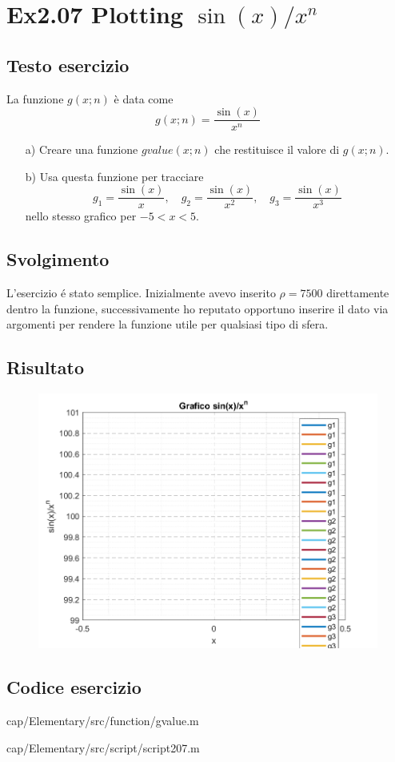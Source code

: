 \section{Ex2.07 Plotting $\sin(x)/x^n$}\label{sec:Plotting_sin}

\subsection{Testo esercizio}
La funzione $g(x;n)$ è data come 
$$g(x;n) = \dfrac{\sin(x)}{x^n}$$

\begin{itemize}
    \item[a)] Creare una funzione $gvalue(x;n)$ che restituisce il valore di $g(x;n)$.
    
    \item[b)] Usa questa funzione per tracciare $$g_1=\dfrac{\sin(x)}{x},\quad 
    g_2=\dfrac{\sin(x)}{x^2}, \quad g_3=\dfrac{\sin(x)}{x^3}$$ nello stesso 
    grafico per $-5<x<5$.
\end{itemize}

\subsection{Svolgimento}
L'esercizio \'e stato semplice. Inizialmente avevo inserito $\rho=7500$ direttamente 
dentro la funzione, successivamente ho reputato opportuno inserire il dato via argomenti 
per rendere la funzione utile per qualsiasi tipo di sfera.

\subsection{Risultato}
\begin{figure}[h]
    \centering
    \includegraphics{cap/Elementary/img/script207}
    \label{fig:script207}
\end{figure}

\subsection{Codice esercizio}

{cap/Elementary/src/function/gvalue.m}


{cap/Elementary/src/script/script207.m}